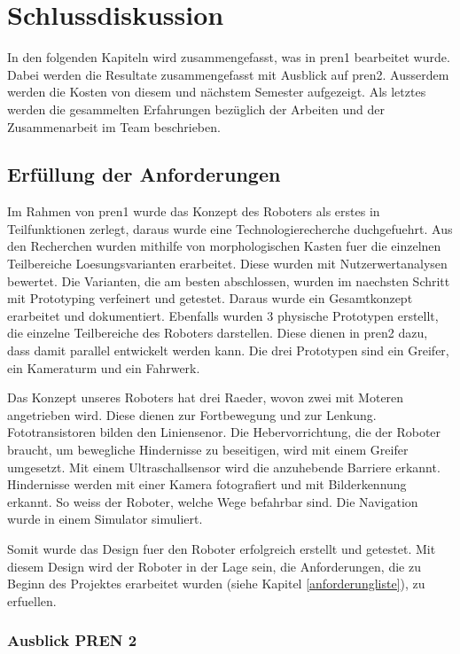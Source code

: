\section{Schlussdiskussion}

In den folgenden Kapiteln wird zusammengefasst, was in \acrshort{pren1} bearbeitet wurde.
Dabei werden die Resultate zusammengefasst mit Ausblick auf \acrshort{pren2}.
Ausserdem werden die Kosten von diesem und nächstem Semester aufgezeigt.
Als letztes werden die gesammelten Erfahrungen bezüglich der Arbeiten und der Zusammenarbeit im Team beschrieben.

\subsection{Erfüllung der Anforderungen}

Im Rahmen von \acrshort{pren1} wurde das Konzept des Roboters als erstes in Teilfunktionen zerlegt, daraus wurde eine Technologierecherche duchgefuehrt. Aus den Recherchen wurden mithilfe von morphologischen Kasten fuer die einzelnen Teilbereiche Loesungsvarianten erarbeitet. Diese wurden mit Nutzerwertanalysen bewertet. Die Varianten, die am besten abschlossen, wurden im naechsten Schritt mit Prototyping verfeinert und getestet. Daraus wurde ein Gesamtkonzept erarbeitet und dokumentiert. Ebenfalls wurden 3 physische Prototypen erstellt, die einzelne Teilbereiche des Roboters darstellen. Diese dienen in \acrshort{pren2} dazu, dass damit parallel entwickelt werden kann. Die drei Prototypen sind ein Greifer, ein Kameraturm und ein Fahrwerk.

Das Konzept unseres Roboters hat drei Raeder, wovon zwei mit Moteren angetrieben wird. Diese dienen zur Fortbewegung und zur Lenkung. Fototransistoren bilden den Liniensenor.
Die Hebervorrichtung, die der Roboter braucht, um bewegliche Hindernisse zu beseitigen, wird mit einem Greifer umgesetzt. Mit einem Ultraschallsensor wird die anzuhebende Barriere erkannt. 
Hindernisse werden mit einer Kamera fotografiert und mit Bilderkennung erkannt. So weiss der Roboter, welche Wege befahrbar sind. Die Navigation wurde in einem Simulator simuliert.

Somit wurde das Design fuer den Roboter erfolgreich erstellt und getestet. Mit diesem Design wird der Roboter in der Lage sein, die Anforderungen, die zu Beginn des Projektes erarbeitet wurden (siehe Kapitel \ref{anforderungliste}), zu erfuellen.

\subsubsection{Ausblick PREN 2}


